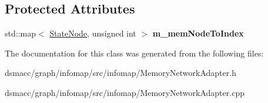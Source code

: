 \subsection*{Protected Attributes}
\begin{DoxyCompactItemize}
\item 
\mbox{\label{classMemoryNetworkAdapter_a22213890d0360f6910c14220edf7b13f}} 
std\+::map$<$ \mbox{\hyperlink{structStateNode}{State\+Node}}, unsigned int $>$ {\bfseries m\+\_\+mem\+Node\+To\+Index}
\end{DoxyCompactItemize}


The documentation for this class was generated from the following files\+:\begin{DoxyCompactItemize}
\item 
dsmacc/graph/infomap/src/infomap/Memory\+Network\+Adapter.\+h\item 
dsmacc/graph/infomap/src/infomap/Memory\+Network\+Adapter.\+cpp\end{DoxyCompactItemize}
